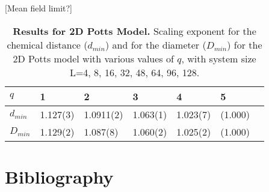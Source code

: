 \documentclass[pre,preprint]{revtex4-1}
\begin{document}



[Mean field limit?]


\begin{table}[h]
\begin{center}
\begin{tabular}{| l | l | l | l | l | l | l |}
\hline
$q$ & 1 & 2 & 3 & 4 & 5\\
\hline
$d_{min}$ & 1.127(3) & 1.0911(2) & 1.063(1) & 1.023(7) & (1.000) \\
\hline
$D_{min}$ & 1.129(2) & 1.087(8) & 1.060(2) & 1.025(2)& (1.000) \\

\hline
\end{tabular}
\caption{\label{tab:dminD2d} {\bf Results for 2D Potts Model.} Scaling exponent for the chemical distance ($d_{min}$) and for the diameter ($D_{min}$) for the 2D Potts model with various values of $q$, with system size L=4, 8, 16, 32, 48, 64, 96, 128.}
\end{center}
\end{table}




\section{Bibliography}

{}
\end{document}
